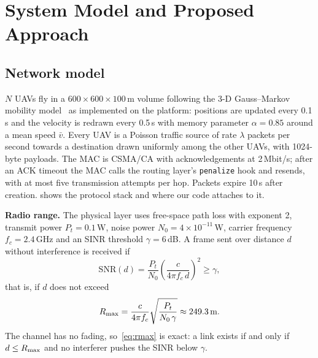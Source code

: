 \section{System Model and Proposed Approach}
\label{sec:model}

\subsection{Network model}
\label{sec:network}

$N$ UAVs fly in a $600\times600\times100$\,m volume following the 3-D Gauss--Markov mobility
model~\cite{broyles2010gaussmarkov} as implemented on the platform: positions are updated every 0.1\,s and
the velocity is redrawn every 0.5\,s with memory parameter $\alpha=0.85$ around a mean speed $\bar v$. Every
UAV is a Poisson traffic source of rate $\lambda$ packets per second towards a destination drawn uniformly
among the other UAVs, with 1024-byte payloads. The MAC is CSMA/CA with acknowledgements at 2\,Mbit/s; after
an ACK timeout the MAC calls the routing layer's \texttt{penalize} hook and resends, with at most five
transmission attempts per hop. Packets expire 10\,s after creation.  shows the protocol stack
and where our code attaches to it.

\textbf{Radio range.} The physical layer uses free-space path loss with exponent 2, transmit power
$P_t=0.1$\,W, noise power $N_0=4\times10^{-11}$\,W, carrier frequency $f_c=2.4$\,GHz and an SINR threshold
$\gamma=6$\,dB. A frame sent over distance $d$ without interference is received if
\begin{equation}
  \mathrm{SNR}(d)=\frac{P_t}{N_0}\left(\frac{c}{4\pi f_c\, d}\right)^{2}\ge\gamma ,
\end{equation}
that is, if $d$ does not exceed
\begin{equation}
  R_{\max}=\frac{c}{4\pi f_c}\sqrt{\frac{P_t}{N_0\,\gamma}}\approx 249.3\,\text{m}.
  \label{eq:rmax}
\end{equation}
The channel has no fading, so~\eqref{eq:rmax} is exact: a link exists if and only if $d\le R_{\max}$ and no
interferer pushes the SINR below $\gamma$.


